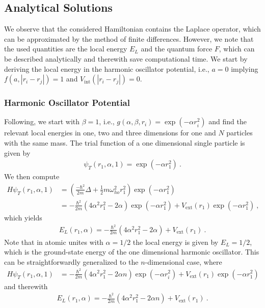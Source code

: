 \documentclass[11pt,a4paper]{article}
\numberwithin{equation}{section}
\begin{document}
\subsection{Analytical Solutions}
%
%
We observe that the considered Hamiltonian contains the Laplace operator, which can be approximated by the method of finite differences.
%
However, we note that the used quantities are the local energy $E_L$ and the quantum force $F$, which can be described analytically and therewith save computational time. 
%
We start by deriving the local energy in the harmonic oscillator potential, i.e., $a=0$ implying $f(a,|r_i-r_j|)=1$ and $V_{\mathrm{int}}(|r_i-r_j|)=0$.
%
\subsubsection{Harmonic Oscillator Potential}
Following, we start with $\beta =1$, i.e., $g(\alpha, \beta, r_i)=\exp(-\alpha r_i^2)$ and find the relevant local energies in one, two and three dimensions for one and $N$ particles with the same mass. 
%
The trial function of a one dimensional single particle is given by
\begin{align*}
\psi_T(r_1,\alpha,1) = \exp(-\alpha r_1^2)~.
\end{align*}
We then compute 
\begin{align*}
H\psi_T(r_1,\alpha,1)
&=
\left(\frac{-\hbar^2}{2m}\Delta +\frac{1}{2}m\omega_{ho}^2r_1^2\right)\exp(-\alpha r_1^2)\\
&=
-\frac{\hbar^2}{2m}\left(4\alpha^2r_1^2-2\alpha\right)\exp(-\alpha r_1^2)+V_{\mathrm{ext}}(r_1)\exp(-\alpha r_1^2)~,
\end{align*}
which yields 
\begin{align*}
E_L(r_1,\alpha)
=
-\frac{\hbar^2}{2m}\left(4\alpha^2r_1^2-2\alpha\right)+V_{\mathrm{ext}}(r_1)~.
\end{align*}
Note that in atomic unites with $\alpha=1/2$ the local energy is given by $E_L = 1/2$, which is the ground-state energy of the one dimensional harmonic oscillator.
% 
This can be straightforwardly generalized to the $n$-dimensional case, where
\begin{align*}
H\psi_T(r_1,\alpha,1)
&=
-\frac{\hbar^2}{2m}\left(4\alpha^2r_1^2-2\alpha n\right)\exp(-\alpha r_i^2)+V_{\mathrm{ext}}(r_1)\exp(-\alpha r_1^2)
\end{align*}
and therewith
\begin{align*}
E_L(r_1,\alpha)
=
-\frac{\hbar^2}{2m}\left(4\alpha^2r_1^2-2\alpha n\right)+V_{\mathrm{ext}}(r_1)~.
\end{align*}
\end{document}
